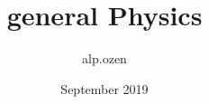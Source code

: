 \documentclass{article}
\title{general Physics}
\author{alp.ozen}
\date{September 2019}
\begin{document}
\maketitle

\section{}
\end{document}
